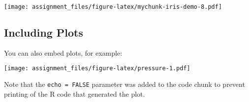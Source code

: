 \documentclass{article}
\begin{document}
\texttt{[image: assignment\_files/figure-latex/mychunk-iris-demo-8.pdf]}

\begin{Shaded}
\begin{Highlighting}[]


\end{Highlighting}
\end{Shaded}

\hypertarget{including-plots}{%
\subsection{Including Plots}\label{including-plots}}

You can also embed plots, for example:

\texttt{[image: assignment\_files/figure-latex/pressure-1.pdf]}

Note that the \texttt{echo\ =\ FALSE} parameter was added to the code
chunk to prevent printing of the R code that generated the plot.


\newpage

\end{document}
